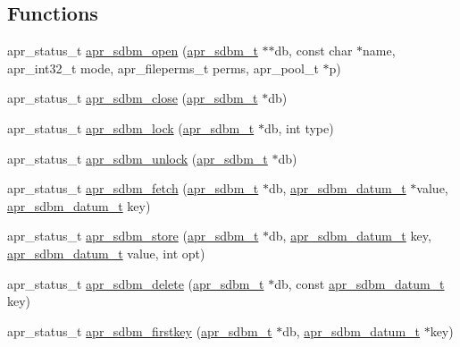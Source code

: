 \subsection*{Functions}
\begin{DoxyCompactItemize}
\item 
apr\-\_\-status\-\_\-t \hyperlink{group___a_p_r___util___d_b_m___s_d_b_m_ga08c6121b4159ae86cec6e915e1e5d758}{apr\-\_\-sdbm\-\_\-open} (\hyperlink{structapr__sdbm__t}{apr\-\_\-sdbm\-\_\-t} $\ast$$\ast$db, const char $\ast$name, apr\-\_\-int32\-\_\-t mode, apr\-\_\-fileperms\-\_\-t perms, apr\-\_\-pool\-\_\-t $\ast$p)
\item 
apr\-\_\-status\-\_\-t \hyperlink{group___a_p_r___util___d_b_m___s_d_b_m_gaf684c3a70d2c9ebe02bb1e2fffe23e1e}{apr\-\_\-sdbm\-\_\-close} (\hyperlink{structapr__sdbm__t}{apr\-\_\-sdbm\-\_\-t} $\ast$db)
\item 
apr\-\_\-status\-\_\-t \hyperlink{group___a_p_r___util___d_b_m___s_d_b_m_ga2c2edd6a123d8ca2a6334fa8874b724d}{apr\-\_\-sdbm\-\_\-lock} (\hyperlink{structapr__sdbm__t}{apr\-\_\-sdbm\-\_\-t} $\ast$db, int type)
\item 
apr\-\_\-status\-\_\-t \hyperlink{group___a_p_r___util___d_b_m___s_d_b_m_gab96a7e08ddac3cb6bff97a822b68de14}{apr\-\_\-sdbm\-\_\-unlock} (\hyperlink{structapr__sdbm__t}{apr\-\_\-sdbm\-\_\-t} $\ast$db)
\item 
apr\-\_\-status\-\_\-t \hyperlink{group___a_p_r___util___d_b_m___s_d_b_m_ga7d9eae450e9f9a2f1bcf626a3f8ca43f}{apr\-\_\-sdbm\-\_\-fetch} (\hyperlink{structapr__sdbm__t}{apr\-\_\-sdbm\-\_\-t} $\ast$db, \hyperlink{structapr__sdbm__datum__t}{apr\-\_\-sdbm\-\_\-datum\-\_\-t} $\ast$value, \hyperlink{structapr__sdbm__datum__t}{apr\-\_\-sdbm\-\_\-datum\-\_\-t} key)
\item 
apr\-\_\-status\-\_\-t \hyperlink{group___a_p_r___util___d_b_m___s_d_b_m_gac12993b882c50afa0777945ea4a88572}{apr\-\_\-sdbm\-\_\-store} (\hyperlink{structapr__sdbm__t}{apr\-\_\-sdbm\-\_\-t} $\ast$db, \hyperlink{structapr__sdbm__datum__t}{apr\-\_\-sdbm\-\_\-datum\-\_\-t} key, \hyperlink{structapr__sdbm__datum__t}{apr\-\_\-sdbm\-\_\-datum\-\_\-t} value, int opt)
\item 
apr\-\_\-status\-\_\-t \hyperlink{group___a_p_r___util___d_b_m___s_d_b_m_ga5744462c07c40d26c275beaeb902ff9c}{apr\-\_\-sdbm\-\_\-delete} (\hyperlink{structapr__sdbm__t}{apr\-\_\-sdbm\-\_\-t} $\ast$db, const \hyperlink{structapr__sdbm__datum__t}{apr\-\_\-sdbm\-\_\-datum\-\_\-t} key)
\item 
apr\-\_\-status\-\_\-t \hyperlink{group___a_p_r___util___d_b_m___s_d_b_m_gae5410d9dc681393e597f492f30c6447f}{apr\-\_\-sdbm\-\_\-firstkey} (\hyperlink{structapr__sdbm__t}{apr\-\_\-sdbm\-\_\-t} $\ast$db, \hyperlink{structapr__sdbm__datum__t}{apr\-\_\-sdbm\-\_\-datum\-\_\-t} $\ast$key)
$$
\end{DoxyCompactItemize}
